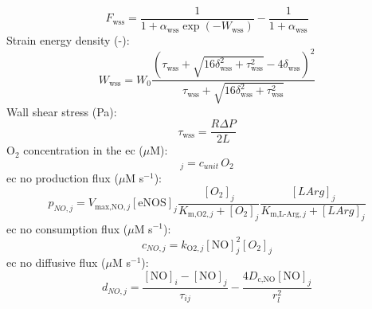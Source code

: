 \documentclass[11pt]{elsarticle}
\newcommand{\mus}{$\mu$M s$^{-1}$\xspace}
\newcommand{\ox}{O$_2$\xspace}
\newcommand{\uM}{$\mu$M\xspace}
\begin{document}
\begin{equation} 
F_{\text{wss}} = \frac{1}{1+\alpha_{\text{wss}} \exp(-W_{\text{wss}})} - \frac{1}{1+\alpha_{\text{wss}}}
\end{equation}	
%
Strain energy density (-): 
\begin{equation} 
W_{\text{wss}} = W_0 \frac{(\tau_{\text{wss}} + \sqrt{16 \delta_{\text{wss}}^2 + \tau_{\text{wss}}^2} - 4 \delta_{\text{wss}})^2}{\tau_{\text{wss}} + \sqrt{16\delta_{\text{wss}}^2 + \tau_{\text{wss}}^2}}
\end{equation}	
%
Wall shear stress (Pa): %
\begin{equation}
\tau_{\text{wss}} = \frac{R \Delta P}{2 L}
\end{equation}
%
\ox concentration in the \gls{ec} (\uM):
\begin{equation}
[O_2]_j =  c_{unit} \, O_2 
\end{equation}
\gls{ec} \gls{no} production flux (\mus):
\begin{equation} 
p_{NO,j} = V_{\text{max,NO},j} [\text{eNOS}]_j  \frac{[O_2]_j}{K_{\text{m,O2},j}+[O_2]_j} \frac{[LArg]_j}{K_{\text{m,L-Arg},j}+[LArg]_j}
\end{equation}	
%
\gls{ec} \gls{no} consumption flux (\mus):
\begin{equation} 
c_{NO,j} = k_{\text{O2},j} [\text{NO}]_j^2 [O_2]_j 
\end{equation}	
%
\gls{ec} \gls{no} diffusive flux (\mus):					
\begin{equation} 
d_{NO,j} = \frac{[\text{NO}]_i - [\text{NO}]_j}{\tau_{ij}} - \frac{4 D_{\text{c,NO}}[\text{NO}]_j}{r_l^2}
\end{equation}		
%
\end{document}
